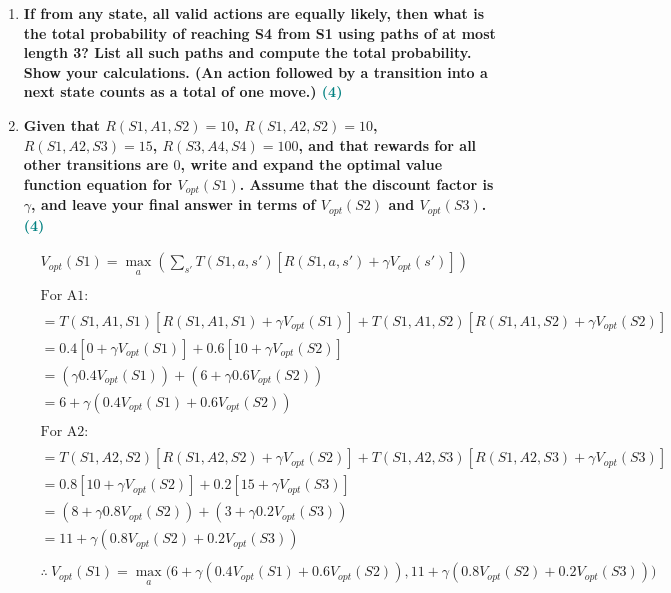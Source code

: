 \documentclass[a4paper]{article}
\begin{document}
\begin{sloppypar}
\begin{enumerate}[start=8,label=Q\arabic*,left=0pt]
    \par 
    
    \item \textbf{If from any state, all valid actions are equally likely, then what is the total probability
    of reaching S4 from S1 using paths of at most length 3? List all such paths and compute
    the total probability. Show your calculations. (An action followed by a transition into a next
    state counts as a total of one move.) \hfill \textcolor{teal}{(4)}}
    
    \par

    \item \textbf{Given that $R(S1, A1, S2) = 10$, $R(S1, A2, S2) = 10$, $R(S1, A2, S3) = 15$, $R(S3, A4, S4) = 100$, 
    and that rewards for all other transitions are $0$, write and expand the optimal value
    function equation for $V_{opt}(S1)$. Assume that the discount factor is $\gamma$, and leave your final
    answer in terms of $V_{opt}(S2)$ and $V_{opt}(S3)$. \hfill \textcolor{teal}{(4)}}
    
    \begin{align*}
        & V_{opt}(S1) = \max_{\substack{a}}\left(\sum_{s'}T(S1, a, s')[R(S1, a, s') + \gamma V_{opt}(s')]\right) \\\\
        & \text{For A1:} \\\\
        & = T(S1, A1, S1)[R(S1, A1, S1) + \gamma V_{opt}(S1)] + T(S1, A1, S2)[R(S1, A1, S2) + \gamma V_{opt}(S2)] \\
        & = 0.4[0 + \gamma V_{opt}(S1)] + 0.6[10 + \gamma V_{opt}(S2)] \\
        & = (\gamma 0.4 V_{opt}(S1)) + (6 + \gamma 0.6 V_{opt}(S2)) \\
        & = 6 + \gamma(0.4 V_{opt}(S1) + 0.6 V_{opt}(S2)) \\\\
        & \text{For A2:} \\\\
        & = T(S1, A2, S2)[R(S1, A2, S2) + \gamma V_{opt}(S2)] + T(S1, A2, S3)[R(S1, A2, S3) + \gamma V_{opt}(S3)] \\
        & = 0.8[10 + \gamma V_{opt}(S2)] + 0.2[15 + \gamma V_{opt}(S3)] \\
        & = (8 + \gamma 0.8 V_{opt}(S2)) + (3 + \gamma 0.2 V_{opt}(S3)) \\
        & = 11 + \gamma(0.8 V_{opt}(S2) + 0.2 V_{opt}(S3)) \\\\
        & \therefore \: V_{opt}(S1) = \max_{\substack{a}} \biggl( 6 + \gamma(0.4 V_{opt}(S1) + 0.6 V_{opt}(S2)), 11 + \gamma(0.8 V_{opt}(S2) + 0.2 V_{opt}(S3)) \biggr)
    \end{align*}


\end{enumerate}
\end{sloppypar}
\end{document}
